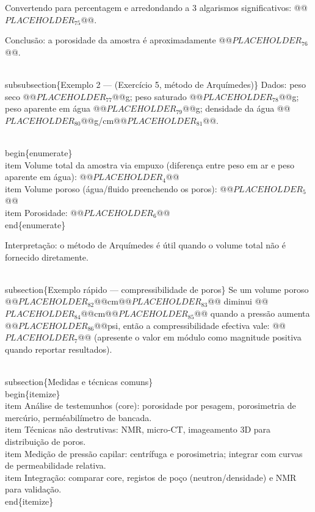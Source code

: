 \documentclass[11pt,a4paper]{article}
\begin{document}
\begin{enumerate}
{Convertendo para percentagem e arredondando a 3 algarismos significativos: @@$PLACEHOLDER_{75}$@@.

Conclusão: a porosidade da amostra é aproximadamente @@$PLACEHOLDER_{76}$@@.

\\subsubsection\{Exemplo 2 — (Exercício 5, método de Arquímedes)\}
Dados: peso seco @@$PLACEHOLDER_{77}$@@g; peso saturado @@$PLACEHOLDER_{78}$@@g; peso aparente em água @@$PLACEHOLDER_{79}$@@g; densidade da água @@$PLACEHOLDER_{80}$@@g/cm@@$PLACEHOLDER_{81}$@@.

\\begin\{enumerate\}
\\item Volume total da amostra via empuxo (diferença entre peso em ar e peso aparente em água):
@@$PLACEHOLDER_{4}$@@
\\item Volume poroso (água/fluido preenchendo os poros):
@@$PLACEHOLDER_{5}$@@
\\item Porosidade:
@@$PLACEHOLDER_{6}$@@
\\end\{enumerate\}

Interpretação: o método de Arquímedes é útil quando o volume total não é fornecido diretamente.

\\subsection\{Exemplo rápido — compressibilidade de poros\}
Se um volume poroso @@$PLACEHOLDER_{82}$@@cm@@$PLACEHOLDER_{83}$@@ diminui @@$PLACEHOLDER_{84}$@@cm@@$PLACEHOLDER_{85}$@@ quando a pressão aumenta @@$PLACEHOLDER_{86}$@@psi, então a compressibilidade efectiva vale:
@@$PLACEHOLDER_{7}$@@
(apresente o valor em módulo como magnitude positiva quando reportar resultados).

\\subsection\{Medidas e técnicas comuns\}
\\begin\{itemize\}
\\item Análise de testemunhos (core): porosidade por pesagem, porosimetria de mercúrio, perméabilímetro de bancada.
\\item Técnicas não destrutivas: NMR, micro‑CT, imageamento 3D para distribuição de poros.
\\item Medição de pressão capilar: centrífuga e porosimetria; integrar com curvas de permeabilidade relativa.
\\item Integração: comparar core, registos de poço (neutron/densidade) e NMR para validação.
\\end\{itemize\}

}
\end{enumerate}
\end{document}
